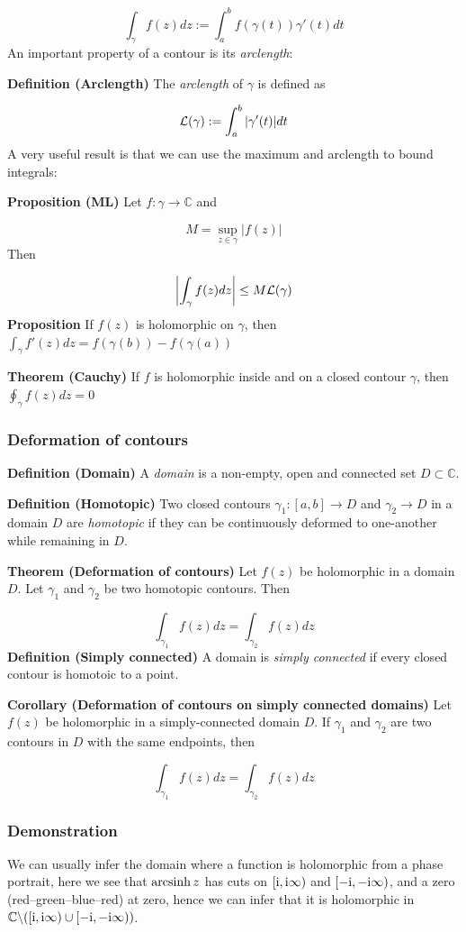 \documentclass[12pt,a4paper]{article}
\def\I{ {\rm i} }
\def\C{ {\mathbb C} }
\def\endash{–}
\begin{document}
\[
\int_\gamma f(z) dz := \int_a^b f(\gamma(t)) \gamma'(t) dt
\]
An important property of a contour is its \emph{arclength}:

\textbf{Definition (Arclength)} The \emph{arclength} of $\gamma$ is defined as

\[
    {\cal L}(\gamma) := \int_a^b |\gamma'(t)| dt
\]
A very useful result is that we can use the maximum and arclength to bound integrals:

\textbf{Proposition (ML)} Let $f : \gamma \rightarrow {\mathbb C}$ and

\[
        M = \sup_{z \in \gamma} |f(z)|
\]
Then

\[
\left|\int_\gamma f(z) dz \right| \leq M {\cal L}(\gamma)
\]
\textbf{Proposition} If $f(z)$ is holomorphic on $\gamma$, then $\int_\gamma f'(z) dz = f(\gamma(b)) - f(\gamma(a))$

\textbf{Theorem (Cauchy)} If $f$ is holomorphic inside and on a closed contour $\gamma$, then $\oint_\gamma f(z) dz = 0$

\subsubsection{Deformation of contours}
\textbf{Definition (Domain)} A \emph{domain} is a non-empty, open and connected set $D \subset {\mathbb C}$.

\textbf{Definition (Homotopic)} Two closed contours $\gamma_1 : [a,b] \rightarrow D$ and $\gamma_2 \rightarrow D$ in a domain $D$ are \emph{homotopic} if they can be continuously deformed to one-another while remaining in $D$.

\textbf{Theorem (Deformation of contours)} Let $f(z)$ be holomorphic in a domain $D$. Let $\gamma_1$ and $\gamma_2$ be two homotopic contours. Then

\[
    \int_{\gamma_1} f(z) dz = \int_{\gamma_2} f(z) dz
\]
\textbf{Definition (Simply connected)} A domain is \emph{simply connected} if every closed contour is homotoic to a point.

\textbf{Corollary (Deformation of contours on simply connected domains)} Let $f(z)$ be holomorphic in a simply-connected domain $D$. If $\gamma_1$ and $\gamma_2$ are two contours in $D$ with the same endpoints, then

\[
    \int_{\gamma_1} f(z) dz = \int_{\gamma_2} f(z) dz
\]
\subsubsection{Demonstration}
We can usually infer the domain where a function is holomorphic from a phase portrait, here we see that ${\rm arcsinh}\, z$ has cuts on $[\I,\I \infty)$ and $[-\I,-\I \infty)$, and a zero  (red\ensuremath{\endash}green\ensuremath{\endash}blue\ensuremath{\endash}red) at zero, hence we can infer that it is holomorphic in $\C \backslash ([\I,\I \infty) \cup [-\I,-\I \infty))$.
\end{document}
